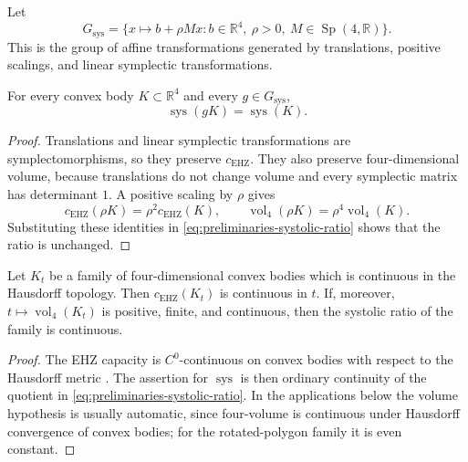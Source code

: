 \begin{definition}
\label{def:preliminaries-systolic-ratio-symmetries}
Let
\[
  G_{\operatorname{sys}}
  =
  \{x\mapsto b+\rho Mx:
    b\in\mathbb R^4,\ \rho>0,\ M\in\operatorname{Sp}(4,\mathbb R)\}.
\]
This is the group of affine transformations generated by translations,
positive scalings, and linear symplectic transformations.
\end{definition}

\begin{lemma}
\label{lem:preliminaries-systolic-ratio-invariance}
For every convex body \(K\subset\mathbb R^4\) and every
\(g\in G_{\operatorname{sys}}\),
\[
  \operatorname{sys}(gK)=\operatorname{sys}(K).
\]
\end{lemma}

\begin{proof}
Translations and linear symplectic transformations are symplectomorphisms, so
they preserve \(c_{\mathrm{EHZ}}\). They also preserve four-dimensional
volume, because translations do not change volume and every symplectic matrix
has determinant \(1\). A positive scaling by \(\rho\) gives
\[
  c_{\mathrm{EHZ}}(\rho K)=\rho^2c_{\mathrm{EHZ}}(K),
  \qquad
  \operatorname{vol}_4(\rho K)=\rho^4\operatorname{vol}_4(K).
\]
Substituting these identities in
\eqref{eq:preliminaries-systolic-ratio} shows that the ratio is unchanged.
\end{proof}

\begin{proposition}[Continuity]\label{prop:preliminaries-sys-hausdorff-continuity}
Let \(K_t\) be a family of four-dimensional convex bodies which is continuous
in the Hausdorff topology. Then \(c_{\mathrm{EHZ}}(K_t)\) is continuous in
\(t\). If, moreover, \(t\mapsto\operatorname{vol}_4(K_t)\) is positive,
finite, and continuous, then the systolic ratio of the family is continuous.
\end{proposition}

\begin{proof}
The EHZ capacity is \(C^0\)-continuous on convex bodies with respect to the
Hausdorff metric \cite{CH2021}. The assertion for \(\operatorname{sys}\) is
then ordinary continuity of the quotient in
\eqref{eq:preliminaries-systolic-ratio}. In the applications below the volume
hypothesis is usually automatic, since four-volume is continuous under
Hausdorff convergence of convex bodies; for the rotated-polygon family it is
even constant.
\end{proof}
